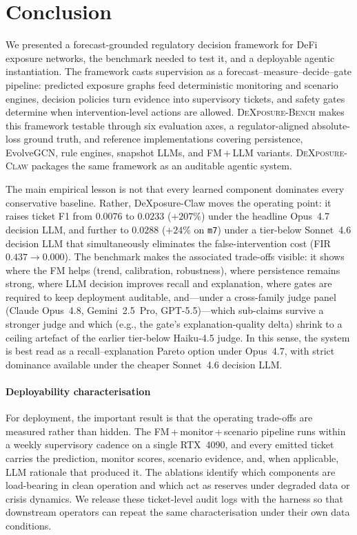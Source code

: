 \documentclass[10pt,journal,compsoc]{IEEEtran}
\begin{document}









\section{Conclusion}

We presented a forecast-grounded regulatory decision framework for DeFi exposure networks, the benchmark needed to test it, and a deployable agentic instantiation. The framework casts supervision as a forecast--measure--decide--gate pipeline: predicted exposure graphs feed deterministic monitoring and scenario engines, decision policies turn evidence into supervisory tickets, and safety gates determine when intervention-level actions are allowed. \textsc{DeXposure-Bench} makes this framework testable through six evaluation axes, a regulator-aligned absolute-loss ground truth, and reference implementations covering persistence, EvolveGCN, rule engines, snapshot LLMs, and FM\,+\,LLM variants. \textsc{DeXposure-Claw} packages the same framework as an auditable agentic system.

The main empirical lesson is not that every learned component dominates every conservative baseline. Rather, DeXposure-Claw moves the operating point: it raises ticket F1 from $0.0076$ to $0.0233$ ($+207\%$) under the headline Opus~4.7 decision LLM, and further to $0.0288$ ($+24\%$ on \texttt{m7}) under a tier-below Sonnet~4.6 decision LLM that simultaneously eliminates the false-intervention cost (FIR $0.437 \to 0.000$). The benchmark makes the associated trade-offs visible: it shows where the FM helps (trend, calibration, robustness), where persistence remains strong, where LLM decision improves recall and explanation, where gates are required to keep deployment auditable, and---under a cross-family judge panel (Claude Opus~4.8, Gemini~2.5~Pro, GPT-5.5)---which sub-claims survive a stronger judge and which (e.g., the gate's explanation-quality delta) shrink to a ceiling artefact of the earlier tier-below Haiku-4.5 judge. In this sense, the system is best read as a recall--explanation Pareto option under Opus~4.7, with strict dominance available under the cheaper Sonnet~4.6 decision LLM.

\paragraph{Deployability characterisation}
For deployment, the important result is that the operating trade-offs are measured rather than hidden. The FM\,+\,monitor\,+\,scenario pipeline runs within a weekly supervisory cadence on a single RTX~4090, and every emitted ticket carries the prediction, monitor scores, scenario evidence, and, when applicable, LLM rationale that produced it. The ablations identify which components are load-bearing in clean operation and which act as reserves under degraded data or crisis dynamics. We release these ticket-level audit logs with the harness so that downstream operators can repeat the same characterisation under their own data conditions.
\end{document}
